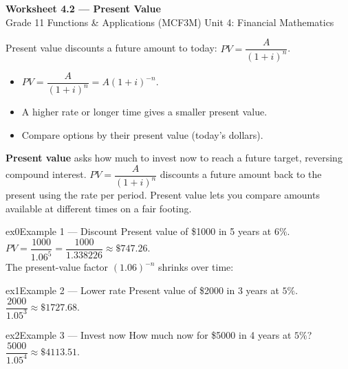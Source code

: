 \documentclass[11pt]{article}
\begin{document}
\begin{center}
{\LARGE\bfseries\color{titleblue}Worksheet 4.2 --- Present Value}\\[2pt]
{\small Grade 11 Functions \& Applications (MCF3M) \textperiodcentered{} Unit 4: Financial Mathematics}
\end{center}

\begin{ideabox}
Present value discounts a future amount to today: $PV=\dfrac{A}{(1+i)^n}$.
\begin{itemize}[leftmargin=*,itemsep=2pt]
  \item $PV=\dfrac{A}{(1+i)^n}=A(1+i)^{-n}$.
  \item A higher rate or longer time gives a smaller present value.
  \item Compare options by their present value (today's dollars).
\end{itemize}
\end{ideabox}

\begin{learnbox}
\textbf{Present value} asks how much to invest now to reach a future target, reversing compound interest.
$PV=\dfrac{A}{(1+i)^n}$ discounts a future amount back to the present using the rate per period.
Present value lets you compare amounts available at different times on a fair footing.
\end{learnbox}


\begin{example}{ex0}{Example 1 --- Discount}
Present value of \$1000 in 5 years at $6\%$.\soln $PV=\dfrac{1000}{1.06^5}=\dfrac{1000}{1.338226}\approx\$747.26$. \\ The present-value factor $(1.06)^{-n}$ shrinks over time:
\end{example}

\begin{example}{ex1}{Example 2 --- Lower rate}
Present value of \$2000 in 3 years at $5\%$.\soln $\dfrac{2000}{1.05^3}\approx\$1727.68$.
\end{example}

\begin{example}{ex2}{Example 3 --- Invest now}
How much now for \$5000 in 4 years at $5\%$?\soln $\dfrac{5000}{1.05^4}\approx\$4113.51$.
\end{example}
\end{document}
